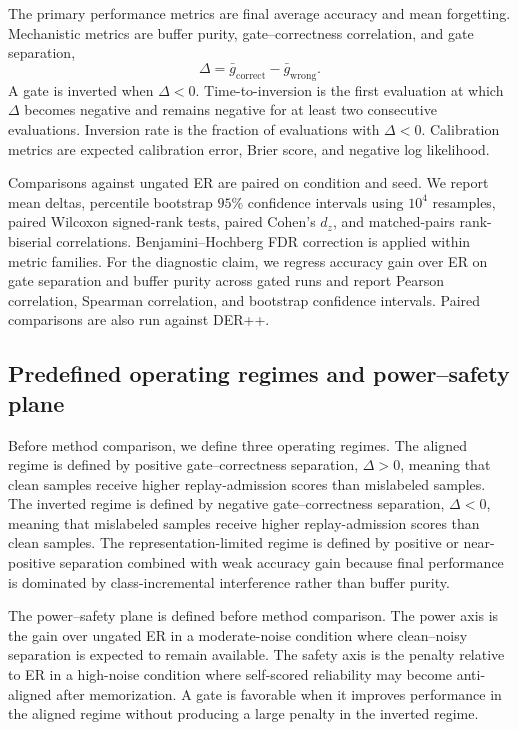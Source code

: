\documentclass[preprint,12pt]{elsarticle}
\begin{document}
The primary performance metrics are final average accuracy and mean forgetting. Mechanistic metrics are buffer purity, gate--correctness correlation, and gate separation,
\begin{equation}
\Delta = \bar{g}_{\mathrm{correct}}-\bar{g}_{\mathrm{wrong}}.
\end{equation}
A gate is inverted when $\Delta<0$. Time-to-inversion is the first evaluation at which $\Delta$ becomes negative and remains negative for at least two consecutive evaluations. Inversion rate is the fraction of evaluations with $\Delta<0$. Calibration metrics are expected calibration error, Brier score, and negative log likelihood.

Comparisons against ungated ER are paired on condition and seed. We report mean deltas, percentile bootstrap $95\%$ confidence intervals using $10^4$ resamples, paired Wilcoxon signed-rank tests, paired Cohen's $d_z$, and matched-pairs rank-biserial correlations. Benjamini--Hochberg FDR correction is applied within metric families. For the diagnostic claim, we regress accuracy gain over ER on gate separation and buffer purity across gated runs and report Pearson correlation, Spearman correlation, and bootstrap confidence intervals. Paired comparisons are also run against DER++.

\subsection{Predefined operating regimes and power--safety plane}

Before method comparison, we define three operating regimes. The aligned regime is defined by positive gate--correctness separation, $\Delta>0$, meaning that clean samples receive higher replay-admission scores than mislabeled samples. The inverted regime is defined by negative gate--correctness separation, $\Delta<0$, meaning that mislabeled samples receive higher replay-admission scores than clean samples. The representation-limited regime is defined by positive or near-positive separation combined with weak accuracy gain because final performance is dominated by class-incremental interference rather than buffer purity.

The power--safety plane is defined before method comparison. The power axis is the gain over ungated ER in a moderate-noise condition where clean--noisy separation is expected to remain available. The safety axis is the penalty relative to ER in a high-noise condition where self-scored reliability may become anti-aligned after memorization. A gate is favorable when it improves performance in the aligned regime without producing a large penalty in the inverted regime.
\end{document}
